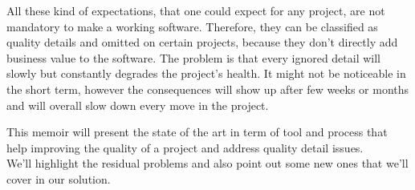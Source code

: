 All these kind of expectations, that one could expect for any project, are
not mandatory to make a working software.
Therefore, they can be classified as quality details and omitted on certain
projects, because they don't directly add business value to the software.
The problem is that every ignored detail will slowly but constantly degrades
the project's health.
It might not be noticeable in the short term, however the consequences will
show up after few weeks or months and will overall slow down every move in
the project.

This memoir will present the state of the art in term of tool
and process that help improving the quality of a project and address quality
detail issues. \\
We'll highlight the residual problems and also point out some new ones that
we'll cover in our solution.